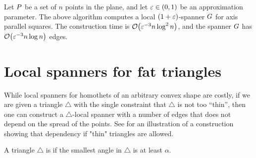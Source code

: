 \documentclass[12pt]{article}%
\begin{document}
\begin{theorem}
    Let $P$ be a set of $n$ points in the plane, and let
    $\varepsilon \in (0,1)$ be an approximation parameter. The above
    algorithm computes a local $(1+\varepsilon)$-spanner $G$ for axis
    parallel squares.  The construction time is
    $\Of\pth{\eps^{-3} n \log^2 n}$, and the spanner $G$ has
    $\Of\pth{\eps^{-3} n \log n}$ edges.
\end{theorem}




\section{Local spanners for fat triangles}



While local spanners for homothets of an arbitrary convex shape are
costly, if we are given a triangle $\triangle$ with the single
constraint that $\triangle$ is not too ``thin'', then one can
construct a $\triangle$-local spanner with a number of edges that does
not depend on the spread of the points. See  for an
illustration of a construction showing that dependency if "thin"
triangles are allowed.



\begin{defn}
    A triangle $\triangle$ is  if the smallest
    angle in $\triangle$ is at least $\alpha$.
\end{defn}
\end{document}
